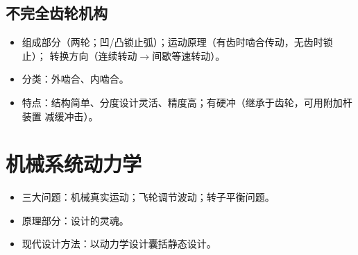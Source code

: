 \documentclass[12pt,a4paper]{article}
\newcommand{\tightlist}{\setlength{\parskip}{0pt}\setlength{\itemsep}{0pt}}
\newcommand{\hint}[1]{\textsf{（#1）}}
\newcommand{\minor}[1]{{\color{gray} #1}}
\newcommand{\then}{$\to$}
\begin{document}
\subsection{不完全齿轮机构}
\begin{itemize}\tightlist
    \item 组成部分\hint{两轮；凹/凸锁止弧}；运动原理\hint{有齿时啮合传动，无齿时锁止}；
    转换方向\hint{连续转动\then 间歇等速转动}。
    \item 分类：外啮合、内啮合。
    \item 特点：结构简单、分度设计灵活、精度高；有硬冲\hint{继承于齿轮，可用附加杆装置
    减缓冲击}。
\end{itemize}


\section{机械系统动力学}
\begin{itemize}\tightlist
    \item 三大问题：机械真实运动；飞轮调节波动；转子平衡问题。
    \item \minor{原理部分：设计的灵魂。}
    \item \minor{现代设计方法：以动力学设计囊括静态设计。}
\end{itemize}
\end{document}
